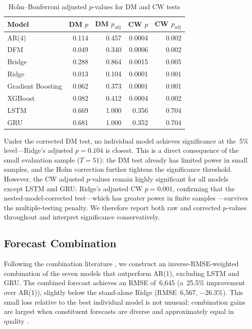 \begin{table}[htbp]
\centering
\caption{Holm--Bonferroni adjusted $p$-values for DM and CW tests}
\label{tab:ch1_holm}
\begin{tabular}{@{} l rr rr @{}}
\toprule
{Model} & {DM $p$} & {DM $p_{\text{adj}}$} & {CW $p$} & {CW $p_{\text{adj}}$} \\
\midrule
AR(4)              & 0.114 & 0.457 & 0.0004 & 0.002 \\
DFM                & 0.049 & 0.340 & 0.0006 & 0.002 \\
Bridge             & 0.288 & 0.864 & 0.0015 & 0.005 \\
Ridge              & 0.013 & 0.104 & 0.0001 & 0.001 \\
Gradient Boosting  & 0.062 & 0.373 & 0.0001 & 0.001 \\
XGBoost            & 0.082 & 0.412 & 0.0004 & 0.002 \\
LSTM               & 0.669 & 1.000 & 0.356  & 0.704 \\
GRU                & 0.681 & 1.000 & 0.352  & 0.704 \\
\bottomrule
\end{tabular}
\end{table}

Under the corrected DM test, no individual model achieves significance at the~5\% level---Ridge's adjusted $p = 0.104$ is closest.  This is a direct consequence of the small evaluation sample ($T = 51$): the DM test already has limited power in small samples, and the Holm correction further tightens the significance threshold.  However, the CW adjusted $p$-values remain highly significant for all models except LSTM and GRU: Ridge's adjusted CW $p = 0.001$, confirming that the nested-model-corrected test---which has greater power in finite samples \citep{clark2007approximately}---survives the multiple-testing penalty.  We therefore report both raw and corrected $p$-values throughout and interpret significance conservatively.

\subsection{Forecast Combination}

Following the combination literature \citep{timmermann2006forecast}, we construct an inverse-RMSE-weighted combination of the seven models that outperform AR(1), excluding LSTM and GRU.  The combined forecast achieves an RMSE of~6{,}645 (a~25.5\% improvement over AR(1)), slightly below the stand-alone Ridge (RMSE~6{,}567, $-26.3$\%).  This small loss relative to the best individual model is not unusual: combination gains are largest when constituent forecasts are diverse and approximately equal in quality \citep{timmermann2006forecast}.

